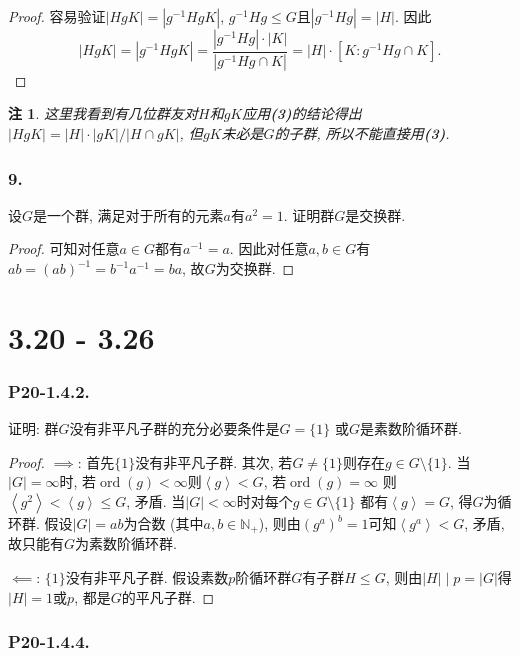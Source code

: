 \documentclass[12pt, a4paper, fontset=windows]{ctexart}
\newcommand{\N}{\mathbb{N}}
\newcommand{\abs}[1]{\left|{#1}\right|}
\newcommand{\gen}[1]{\left\langle{#1}\right\rangle}
\newcommand{\ord}{\operatorname{ord}}
\newtheorem*{remark}{注}
\begin{document}
\begin{proof}
容易验证$\abs{HgK}=\abs{g^{-1}HgK}$, $g^{-1}Hg\le G$且$\abs{g^{-1}Hg}=\abs{H}$. 
因此\[\abs{HgK}=\abs{g^{-1}HgK}=\frac{\abs{g^{-1}Hg}\cdot\abs{K}}{\abs{g^{-1}Hg\cap K}}=\abs{H}\cdot[K:g^{-1}Hg\cap K].\]
\end{proof}

\begin{remark}
这里我看到有几位群友对$H$和$gK$应用{\bf (3)}的结论得出
$\abs{HgK}=\abs{H}\cdot\abs{gK}/\abs{H\cap gK}$, 
但$gK$未必是$G$的子群, 所以不能直接用{\bf (3)}. 
\end{remark}

\section*{9.}

设$G$是一个群, 满足对于所有的元素$a$有$a^2=1$. 
证明群$G$是交换群. 

\begin{proof}
可知对任意$a\in G$都有$a^{-1}=a$. 因此对任意$a,b\in G$有
$ab=(ab)^{-1}=b^{-1}a^{-1}=ba$, 故$G$为交换群. 
\end{proof}

\clearpage
\part{3.20 - 3.26}

\section*{P20-1.4.2.}

证明: 群$G$没有非平凡子群的充分必要条件是$G=\{1\}$
或$G$是素数阶循环群. 

\begin{proof}
$\implies$: 
首先$\{1\}$没有非平凡子群. 其次, 若$G\ne\{1\}$则存在$g\in G\setminus\{1\}$. 
当$\abs{G}=\infty$时, 若$\ord(g)<\infty$则$\gen{g}<G$, 若$\ord(g)=\infty$
则$\gen{g^2}<\gen{g}\le G$, 矛盾. 当$\abs{G}<\infty$时对每个$g\in G\setminus\{1\}$
都有$\gen{g}=G$, 得$G$为循环群. 假设$\abs{G}=ab$为合数 (其中$a,b\in\N_+$), 
则由$(g^a)^b=1$可知$\gen{g^a}<G$, 矛盾, 故只能有$G$为素数阶循环群. 

$\impliedby$: 
$\{1\}$没有非平凡子群. 假设素数$p$阶循环群$G$有子群$H\le G$, 
则由$\abs{H}\mid p=\abs{G}$得$\abs{H}=1$或$p$, 都是$G$的平凡子群. 
\end{proof}

\section*{P20-1.4.4.}
\end{document}

